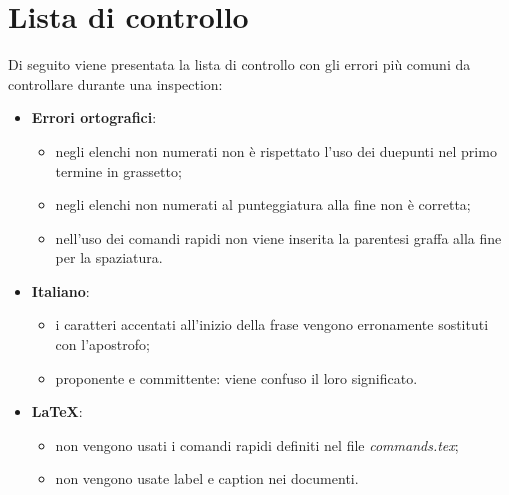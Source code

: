 %


\appendix
\section{Lista di controllo} %
\label{sec:lista_di_controllo}
Di seguito viene presentata la lista di controllo con gli errori più comuni da controllare durante una inspection:
	\begin{itemize}
		\item \textbf{Errori ortografici}:
			\begin{itemize}
				\item negli elenchi non numerati non è rispettato l'uso dei duepunti nel primo termine in grassetto;
				\item negli elenchi non numerati al punteggiatura alla fine non è corretta;
				\item nell'uso dei comandi rapidi non viene inserita la parentesi graffa alla fine per la spaziatura.
			\end{itemize}

		\item \textbf{Italiano}:
			\begin{itemize}
				\item i caratteri accentati all'inizio della frase vengono erronamente sostituti con l'apostrofo;
				\item proponente e committente: viene confuso il loro significato.
			\end{itemize}

		\item \textbf{\LaTeX}:
			\begin{itemize}
				\item non vengono usati i comandi rapidi definiti nel file \emph{commands.tex};
				\item non vengono usate label e caption nei documenti.
			\end{itemize}
	\end{itemize}
